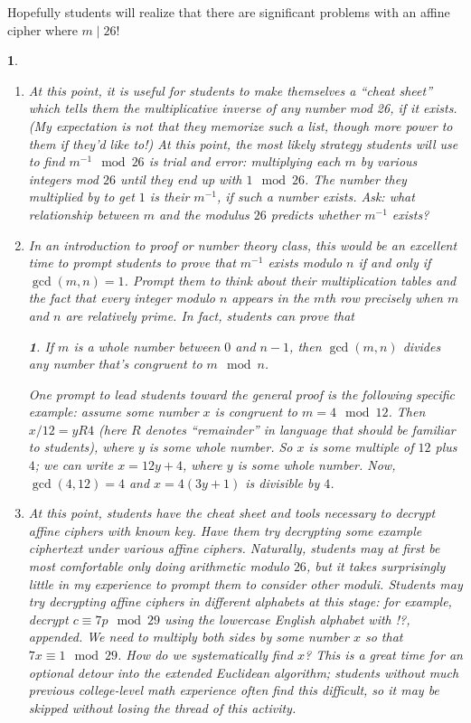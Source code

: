 \documentclass[11pt]{article}
\theoremstyle{plain}
\theoremstyle{remark}
\theoremstyle{definition}
\theoremstyle{definition}
\theoremstyle{definition}
\theoremstyle{plain}
\theoremstyle{plain}
\newtheorem{prop}[thm]{\protect\propositionname}
\theoremstyle{plain}
\newtheorem{act}[thm]{\protect\activityname}
\theoremstyle{definition}
\providecommand{\propositionname}{Proposition}
\providecommand{\activityname}{Activity}
\begin{document}
Hopefully students will realize that there are significant problems
with an affine cipher where $m\mid26$! 

\begin{act}
	
\begin{enumerate}
\item At this point, it is useful for students to make themselves a ``cheat sheet'' which tells them
the multiplicative inverse of any number mod 26, if it exists. (My
expectation is not that they memorize such a list, though more power
to them if they'd like to!) At this point, the most likely strategy
students will use to find $m^{-1}\mod26$ is trial and error: multiplying
each $m$ by various integers mod $26$ until they end up with $1\mod26$.
The number they multiplied by to get $1$ is their $m^{-1}$, if such
a number exists. Ask: what relationship between $m$ and the modulus
$26$ predicts whether $m^{-1}$ exists?

\item In an introduction to proof or number theory class, this would be
an excellent time to prompt students to prove that $m^{-1}$ exists
modulo $n$ if and only if $\gcd(m,n)=1$. Prompt them to think about
their multiplication tables and the fact that every integer modulo
$n$ appears in the $m$th row precisely when $m$ and $n$ are relatively
prime. In fact, students can prove that 
\begin{prop}
\label{KI-prop-gcd(m,n)-divides-mk}If $m$ is a whole number between
$0$ and $n-1$, then $\gcd(m,n)$ divides any number that's congruent
to $m\mod n$. 
\end{prop}

One prompt to lead students toward the general proof is the following
specific example: assume some number $x$ is congruent to $m=4\mod12$.
Then $x/12=yR4$ (here $R$ denotes ``remainder'' in language that
should be familiar to students), where $y$ is some whole number.
So $x$ is some multiple of $12$ plus $4$; we can write $x=12y+4$,
where $y$ is some whole number. Now, $\gcd(4,12)=4$ and $x=4(3y+1)$
is divisible by $4$. 

\item At this point, students have the cheat sheet and tools necessary to
decrypt affine ciphers with known key. Have them try decrypting some
example ciphertext under various affine ciphers. Naturally, students
may at first be most comfortable only doing arithmetic modulo $26$,
but it takes surprisingly little in my experience to prompt them to
consider other moduli. Students may try decrypting affine
ciphers in different alphabets at this stage: for example, decrypt
$c\equiv7p\mod29$ using the lowercase English alphabet with !?, appended.
We need to multiply both sides by some number $x$ so that $7x\equiv1\mod29$.
How do we systematically find $x$? This is a great time for an optional
detour into the extended Euclidean algorithm; students without much
previous college-level math experience often find this difficult,
so it may be skipped without losing the thread of this activity.


\end{enumerate}
\end{act}
\end{document}
